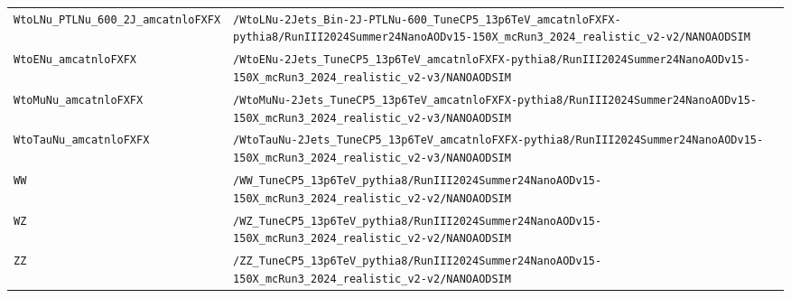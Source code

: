 \begin{longtable}{@{}>{\RaggedRight\arraybackslash}p{} >{\RaggedRight\arraybackslash}p{}@{}}
\addlinespace[2pt]
\texttt{WtoLNu\_\allowbreak{}PTLNu\_\allowbreak{}600\_\allowbreak{}2J\_\allowbreak{}amcatnloFXFX} & \texttt{/\allowbreak{}WtoLNu-\allowbreak{}2Jets\_\allowbreak{}Bin-\allowbreak{}2J-\allowbreak{}PTLNu-\allowbreak{}600\_\allowbreak{}TuneCP5\_\allowbreak{}13p6TeV\_\allowbreak{}amcatnloFXFX-\allowbreak{}pythia8/\allowbreak{}RunIII2024Summer24NanoAODv15-\allowbreak{}150X\_\allowbreak{}mcRun3\_\allowbreak{}2024\_\allowbreak{}realistic\_\allowbreak{}v2-\allowbreak{}v2/\allowbreak{}NANOAODSIM} \\
\addlinespace[2pt]
\texttt{WtoENu\_\allowbreak{}amcatnloFXFX} & \texttt{/\allowbreak{}WtoENu-\allowbreak{}2Jets\_\allowbreak{}TuneCP5\_\allowbreak{}13p6TeV\_\allowbreak{}amcatnloFXFX-\allowbreak{}pythia8/\allowbreak{}RunIII2024Summer24NanoAODv15-\allowbreak{}150X\_\allowbreak{}mcRun3\_\allowbreak{}2024\_\allowbreak{}realistic\_\allowbreak{}v2-\allowbreak{}v3/\allowbreak{}NANOAODSIM} \\
\addlinespace[2pt]
\texttt{WtoMuNu\_\allowbreak{}amcatnloFXFX} & \texttt{/\allowbreak{}WtoMuNu-\allowbreak{}2Jets\_\allowbreak{}TuneCP5\_\allowbreak{}13p6TeV\_\allowbreak{}amcatnloFXFX-\allowbreak{}pythia8/\allowbreak{}RunIII2024Summer24NanoAODv15-\allowbreak{}150X\_\allowbreak{}mcRun3\_\allowbreak{}2024\_\allowbreak{}realistic\_\allowbreak{}v2-\allowbreak{}v3/\allowbreak{}NANOAODSIM} \\
\addlinespace[2pt]
\texttt{WtoTauNu\_\allowbreak{}amcatnloFXFX} & \texttt{/\allowbreak{}WtoTauNu-\allowbreak{}2Jets\_\allowbreak{}TuneCP5\_\allowbreak{}13p6TeV\_\allowbreak{}amcatnloFXFX-\allowbreak{}pythia8/\allowbreak{}RunIII2024Summer24NanoAODv15-\allowbreak{}150X\_\allowbreak{}mcRun3\_\allowbreak{}2024\_\allowbreak{}realistic\_\allowbreak{}v2-\allowbreak{}v3/\allowbreak{}NANOAODSIM} \\
\addlinespace[2pt]
\texttt{WW} & \texttt{/\allowbreak{}WW\_\allowbreak{}TuneCP5\_\allowbreak{}13p6TeV\_\allowbreak{}pythia8/\allowbreak{}RunIII2024Summer24NanoAODv15-\allowbreak{}150X\_\allowbreak{}mcRun3\_\allowbreak{}2024\_\allowbreak{}realistic\_\allowbreak{}v2-\allowbreak{}v2/\allowbreak{}NANOAODSIM} \\
\addlinespace[2pt]
\texttt{WZ} & \texttt{/\allowbreak{}WZ\_\allowbreak{}TuneCP5\_\allowbreak{}13p6TeV\_\allowbreak{}pythia8/\allowbreak{}RunIII2024Summer24NanoAODv15-\allowbreak{}150X\_\allowbreak{}mcRun3\_\allowbreak{}2024\_\allowbreak{}realistic\_\allowbreak{}v2-\allowbreak{}v2/\allowbreak{}NANOAODSIM} \\
\addlinespace[2pt]
\texttt{ZZ} & \texttt{/\allowbreak{}ZZ\_\allowbreak{}TuneCP5\_\allowbreak{}13p6TeV\_\allowbreak{}pythia8/\allowbreak{}RunIII2024Summer24NanoAODv15-\allowbreak{}150X\_\allowbreak{}mcRun3\_\allowbreak{}2024\_\allowbreak{}realistic\_\allowbreak{}v2-\allowbreak{}v2/\allowbreak{}NANOAODSIM} \\

\end{longtable}
